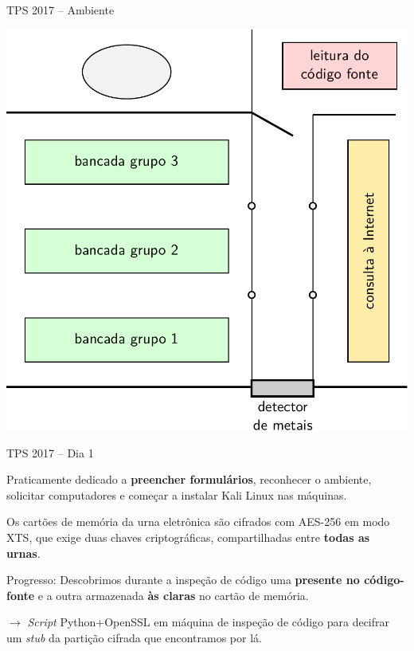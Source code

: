 \documentclass[10pt]{beamer}
\begin{document}
\begin{frame}{TPS 2017 -- Ambiente}
\begin{center}
\includegraphics[scale=0.5]{planta.pdf}
\end{center}
\end{frame}


\begin{frame}{TPS 2017 -- Dia 1}

Praticamente dedicado a {\bf preencher formulários}, reconhecer o ambiente, solicitar computadores e começar a instalar Kali Linux nas máquinas.

\medskip

Os cartões de memória da urna eletrônica são cifrados com AES-256 em modo XTS, que exige duas chaves criptográficas, compartilhadas entre {\bf todas as urnas}.

\medskip

\alert{Progresso:} Descobrimos durante a inspeção de código uma {\bf presente no código-fonte} e a outra armazenada {\bf às claras} no cartão de memória.

\medskip

\alert{$\rightarrow$} \emph{Script} Python+OpenSSL em máquina de inspeção de código para decifrar um \emph{stub} da partição cifrada que encontramos por lá.

\end{frame}
\end{document}
